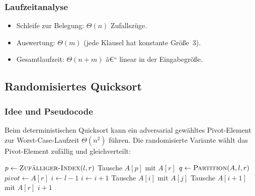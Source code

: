 ﻿\documentclass[12pt,a4paper]{article}
\theoremstyle{definition}
\theoremstyle{plain}
\theoremstyle{remark}
\begin{document}
\subsubsection{Laufzeitanalyse}

\begin{itemize}
  \item Schleife zur Belegung: $\Theta(n)$ Zufallszüge.
  \item Auswertung: $\Theta(m)$ (jede Klausel hat konstante Größe~3).
  \item Gesamtlaufzeit: $\Theta(n + m)$ â€“ linear in der Eingabegröße.
\end{itemize}

\subsection{Randomisiertes Quicksort}
\label{subsec:rqs}

\subsubsection{Idee und Pseudocode}

Beim deterministischen Quicksort kann ein adversarial gewähltes Pivot-Element
zur Worst-Case-Laufzeit $\Theta(n^2)$ führen. Die randomisierte Variante
wählt das Pivot-Element zufällig und gleichverteilt:

\begin{algorithm}[H]
  \caption{Randomisiertes Quicksort}
  \label{alg:rqs}
  \begin{algorithmic}[1]
        \State \Return
      \EndIf
      \State $p \gets \textsc{Zufälliger-Index}(l, r)$
      \State Tausche $A[p]$ mit $A[r]$
      \State $q \gets \textsc{Partition}(A, l, r)$
      \State {}
      \State {}
    \EndFunction
    \Statex
      \State $\mathit{pivot} \gets A[r]$
      \State $i \gets l - 1$
          \State $i \gets i+1$
          \State Tausche $A[i]$ mit $A[j]$
        \EndIf
      \EndFor
      \State Tausche $A[i+1]$ mit $A[r]$
      \State \Return $i+1$
    \EndFunction
  \end{algorithmic}
\end{algorithm}
\end{document}
